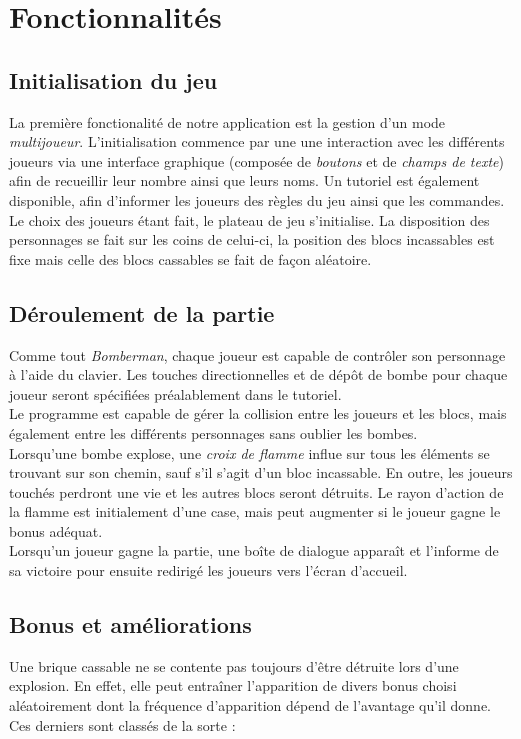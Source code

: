 \newpage
\section{Fonctionnalités}
\subsection{Initialisation du jeu}
La première fonctionalité de notre application est la gestion d'un mode \textit{multijoueur}. 
L'initialisation commence par une une interaction avec les différents joueurs via une interface 
graphique (composée de \textit{boutons} et de \textit{champs de texte}) afin de recueillir leur 
nombre ainsi que leurs noms. Un tutoriel est également disponible, afin d'informer les joueurs 
des règles du jeu ainsi que les commandes.\\
Le choix des joueurs étant fait, le plateau de jeu s'initialise. La disposition des personnages 
se fait sur les coins de celui-ci, la position des blocs incassables est fixe mais celle des 
blocs cassables se fait de façon aléatoire.

\subsection{Déroulement de la partie}
Comme tout \textit{Bomberman}, chaque joueur est capable de contrôler son personnage à l'aide 
du clavier. Les touches directionnelles et de dépôt de bombe pour chaque joueur seront spécifiées 
préalablement dans le tutoriel. \\
Le programme est capable de gérer la collision entre les joueurs et les blocs, mais également entre
les différents personnages sans oublier les bombes.\\
Lorsqu'une bombe explose, une \textit{croix de flamme} influe sur tous les éléments se trouvant sur 
son chemin, sauf s'il s'agit d'un bloc incassable. En outre, les joueurs touchés perdront une vie 
et les autres blocs seront détruits. Le rayon d'action de la flamme est initialement d'une case, 
mais peut augmenter si le joueur gagne le bonus adéquat.\\
Lorsqu'un joueur gagne la partie, une boîte de dialogue apparaît et l'informe de sa victoire pour 
ensuite redirigé les joueurs vers l'écran d'accueil.

\subsection{Bonus et améliorations}
Une brique cassable ne se contente pas toujours d'être détruite lors d'une explosion. En effet, elle 
peut entraîner l'apparition de divers bonus choisi aléatoirement dont la fréquence d'apparition dépend
de l'avantage qu'il donne. Ces derniers sont classés de la sorte : 

